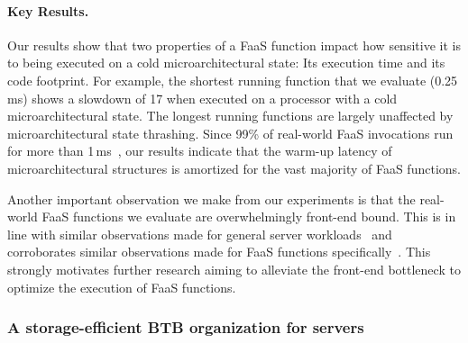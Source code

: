 \documentclass[../main.tex]{subfiles}
\begin{document}
\begin{refsection}
\paragraph{Key Results.}
Our results show that two properties of a FaaS function impact how
sensitive it is to being executed on a cold microarchitectural state:
Its execution time and its code footprint. For example, the shortest
running function that we evaluate (0.25\,ms) shows a slowdown of
17\texttimes{} when executed on a processor with a cold
microarchitectural state. The longest running functions are largely
unaffected by microarchitectural state thrashing. Since 99\% of
real-world FaaS invocations run for more than
1\,ms~\cite{shahrad20_server_wild}, our results indicate that the
warm-up latency of microarchitectural structures is amortized for the
vast majority of FaaS functions.

Another important observation we make from our experiments is that the
real-world FaaS functions we evaluate are overwhelmingly front-end
bound. This is in line with similar observations made for general
server
workloads~\cite{ferdman12_clear_cloud,kanev15_profil,ayers19_asmdb}
and corroborates similar observations made for FaaS functions
specifically~\cite{lukewarm_serverless}. This strongly motivates
further research aiming to alleviate the front-end bottleneck to
optimize the execution of FaaS functions.



\subsubsection{A storage-efficient BTB organization for servers}
\label{subsub:btbx}


\end{refsection}
\end{document}
